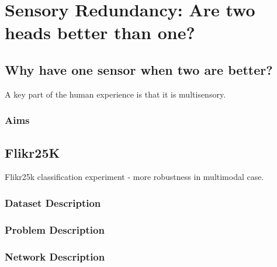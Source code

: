 
\chapter{Sensory Redundancy: Are two heads better than one?} %

\label{Chapter4} %



\section{Why have one sensor when two are better?}
A key part of the human experience is that it is multisensory. 
\subsection{Aims}
\section{Flikr25K}
\label{sec:flikr}
Flikr25k classification experiment - more robustness in multimodal case.
\subsection{Dataset Description}
\subsection{Problem Description}
\subsection{Network Description}
